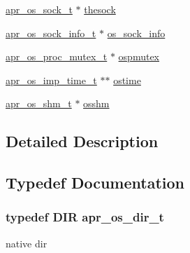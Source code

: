 \begin{DoxyCompactItemize}
\item 
\hyperlink{group__apr__portabile_ga2965cd2e48cb6513bc0ba05aa6083ed7}{apr\+\_\+os\+\_\+sock\+\_\+t} $\ast$ \hyperlink{group__apr__portabile_ga7416ad406fa85593c0df6de8348d86f6}{thesock}
\item 
\hyperlink{structapr__os__sock__info__t}{apr\+\_\+os\+\_\+sock\+\_\+info\+\_\+t} $\ast$ \hyperlink{group__apr__portabile_gaa1f4b361ddc24ad6f9a0ea53fe15ca61}{os\+\_\+sock\+\_\+info}
\item 
\hyperlink{structapr__os__proc__mutex__t}{apr\+\_\+os\+\_\+proc\+\_\+mutex\+\_\+t} $\ast$ \hyperlink{group__apr__portabile_ga12fd28a11c71068b98ef2f853017b3bb}{ospmutex}
\item 
\hyperlink{group__apr__portabile_ga6d27e476300cd1d3fda24e1ff0e358e1}{apr\+\_\+os\+\_\+imp\+\_\+time\+\_\+t} $\ast$$\ast$ \hyperlink{group__apr__portabile_gacf633ad600785438570220feb0b7f86d}{ostime}
\item 
\hyperlink{group__apr__portabile_ga7af1085d6390fbd08d66482b8c17de51}{apr\+\_\+os\+\_\+shm\+\_\+t} $\ast$ \hyperlink{group__apr__portabile_gab053810bbd26762872ea5e7847607dd8}{osshm}
\end{DoxyCompactItemize}


\subsection{Detailed Description}


\subsection{Typedef Documentation}
\subsubsection[{\texorpdfstring{apr\+\_\+os\+\_\+dir\+\_\+t}{apr_os_dir_t}}]{\setlength{\rightskip}{0pt plus 5cm}typedef D\+IR {\bf apr\+\_\+os\+\_\+dir\+\_\+t}}\hypertarget{group__apr__portabile_gacb790646cfc3da1b43a5f7c4bfaa3937}{}\label{group__apr__portabile_gacb790646cfc3da1b43a5f7c4bfaa3937}
native dir 
